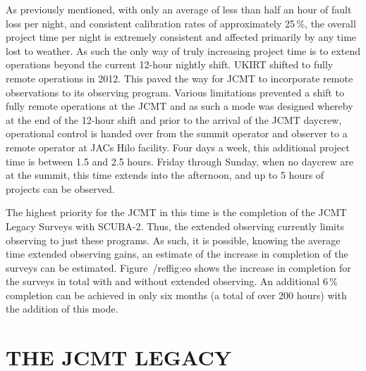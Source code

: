 \documentclass[]{spie}  %
\begin{document}
As previously mentioned, with only an average of less than half an
hour of fault loss per night, and consistent calibration rates of
approximately 25\,$\%$, the overall project time per night is extremely
consistent and affected primarily by any time lost to weather. As such
the only way of truly increasing project time is to extend operations
beyond the current 12-hour nightly shift. UKIRT shifted to fully
remote operations in 2012.\cite{2012SPIE.8448E..1GK} This paved the way for JCMT to
incorporate remote observations to its observing program.\cite{2014SPIE9149-93} Various
limitations prevented a shift to fully remote operations at the JCMT
and as such a mode was designed whereby at the end of the 12-hour
shift and prior to the arrival of the JCMT daycrew, operational
control is handed over from the summit operator and observer to a
remote operator at JACs Hilo facility. Four days a week, this
additional project time is between 1.5 and 2.5 hours. Friday
through Sunday, when no daycrew are at the summit, this time extends
into the afternoon, and up to 5 hours of projects can be observed.

The highest priority for the JCMT in this time is the completion of
the JCMT Legacy Surveys with SCUBA-2. Thus, the extended observing
currently limits observing to just these programs. As such, it is
possible, knowing the average time extended observing gains, an
estimate of the increase in completion of the surveys can be
estimated. Figure~/ref{fig:eo} shows the increase in completion for
the surveys in total with and without extended observing. An
additional 6\,$\%$ completion can be achieved in only six months (a
total of over 200 hours) with the addition of this mode.



\section{THE JCMT LEGACY}
\end{document}
